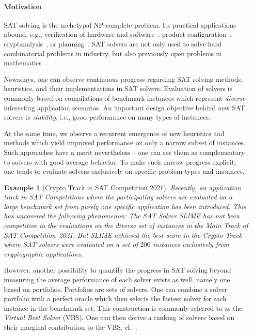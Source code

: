 \documentclass[conference]{IEEEtran}
\newtheorem{example}{Example}
\begin{document}
\paragraph{Motivation}

SAT solving is the archetypal NP-complete problem.
Its practical applications abound, e.g., verification of hardware and software~\cite{Kaufmann:2021:Amulet,Buning:2020:QPRVerify}, product configuration~\cite{Janota:2014:Configuration}, cryptanalysis~\cite{Nejati:2020:CDCLCrypto}, or planning~\cite{Schreiber:2021:Lilotane}.
SAT solvers are not only used to solve hard combinatorial problems in industry, but also previously open problems in mathematics~\cite{Heule:2016:Pyth,Heule:2018:Schur}. 

Nowadays, one can observe continuous progress regarding SAT solving methods, heuristics, and their implementations in SAT solvers. 
Evaluation of solvers is commonly based on compilations of benchmark instances which represent \emph{diverse} interesting application scenarios. 
An important design objective behind new SAT solvers is \emph{stability}, i.e., good performance on many types of instances. 

At the same time, we observe a recurrent emergence of new heuristics and methods which yield improved performance on only a narrow subset of instances. 
Such approaches have a merit nevertheless -- one can see them as complementary to solvers with good average behavior. 
To make such narrow progress explicit, one tends to evaluate solvers exclusively on specific problem types and instances.

\begin{example}[Crypto Track in SAT Competition 2021]
Recently, an application track in SAT Competitions where the participating solvers are evaluated on a large benchmark set from purely one specific application has been introduced. This has uncovered the following phenomenon: The SAT Solver \emph{SLIME} has not been competitive in the evaluations on the diverse set of instances in the Main Track of SAT Competition~2021. 
But \emph{SLIME} achieved the best score in the Crypto Track where SAT solvers were evaluated on a set of $200$ instances exclusively from cryptographic applications. 
\end{example}

However, another possibility to quantify the progress in SAT solving beyond measuring the average performance of each solver exists as well, namely one based on portfolios. 
Portfolios are sets of solvers.  
One can combine a solver portfolio with a perfect oracle which then selects the fastest solver for each instance in the benchmark set. 
This construction is commonly referred to as the \emph{Virtual Best Solver} (VBS). 
One can then derive a ranking of solvers based on their marginal contribution to the VBS, cf.~\cite{Xu:2012:EvalContribVBS}. 
\end{document}
